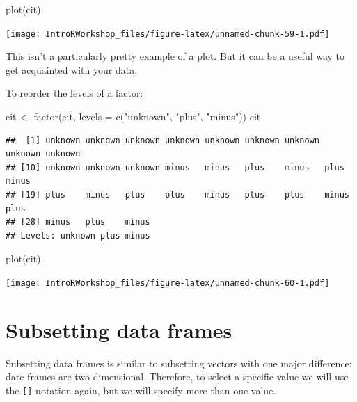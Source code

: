 \documentclass[
]{book}
\newenvironment{Shaded}{\begin{snugshade}}{\end{snugshade}}
\newcommand{\AttributeTok}[1]{\textcolor[rgb]{0.77,0.63,0.00}{#1}}
\newcommand{\FunctionTok}[1]{\textcolor[rgb]{0.00,0.00,0.00}{#1}}
\newcommand{\NormalTok}[1]{#1}
\newcommand{\OtherTok}[1]{\textcolor[rgb]{0.56,0.35,0.01}{#1}}
\newcommand{\StringTok}[1]{\textcolor[rgb]{0.31,0.60,0.02}{#1}}
\begin{document}
\begin{Shaded}
\begin{Highlighting}[]
\FunctionTok{plot}\NormalTok{(cit)}
\end{Highlighting}
\end{Shaded}

\texttt{[image: IntroRWorkshop\_files/figure-latex/unnamed-chunk-59-1.pdf]}

This isn't a particularly pretty example of a plot. But it can be a useful way to get acquainted with your data.

To reorder the levels of a factor:

\begin{Shaded}
\begin{Highlighting}[]
\NormalTok{cit }\OtherTok{\textless{}{-}} \FunctionTok{factor}\NormalTok{(cit, }\AttributeTok{levels =} \FunctionTok{c}\NormalTok{(}\StringTok{"unknown"}\NormalTok{, }\StringTok{"plus"}\NormalTok{, }\StringTok{"minus"}\NormalTok{))}
\NormalTok{cit}
\end{Highlighting}
\end{Shaded}

\begin{verbatim}
##  [1] unknown unknown unknown unknown unknown unknown unknown unknown unknown
## [10] unknown unknown unknown minus   minus   plus    minus   plus    minus  
## [19] plus    minus   plus    plus    minus   plus    plus    minus   plus   
## [28] minus   plus    minus  
## Levels: unknown plus minus
\end{verbatim}

\begin{Shaded}
\begin{Highlighting}[]
\FunctionTok{plot}\NormalTok{(cit)}
\end{Highlighting}
\end{Shaded}

\texttt{[image: IntroRWorkshop\_files/figure-latex/unnamed-chunk-60-1.pdf]}

\hypertarget{subsetting-data-frames}{%
\section{Subsetting data frames}\label{subsetting-data-frames}}

Subsetting data frames is similar to subsetting vectors with one major difference: date frames are two-dimensional. Therefore, to select a specific value we will use the \texttt{{[}{]}} notation again, but we will specify more than one value.
\end{document}
